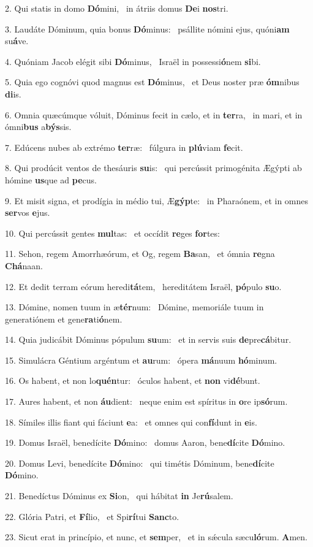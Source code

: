 2. Qui statis in domo \textbf{Dó}mini, \ast\  in átriis domus \textbf{De}i \textbf{nos}tri.\

3. Laudáte Dóminum, quia bonus \textbf{Dó}minus: \ast\  psállite nómini ejus, quóni\textbf{am} su\textbf{á}ve.\

4. Quóniam Jacob elégit sibi \textbf{Dó}minus, \ast\  Israël in possessi\textbf{ó}nem \textbf{si}bi.\

5. Quia ego cognóvi quod magnus est \textbf{Dó}minus, \ast\  et Deus noster præ \textbf{óm}nibus \textbf{di}is.\

6. Omnia quæcúmque vóluit, Dóminus fecit in cælo, et in \textbf{ter}ra, \ast\  in mari, et in ómni\textbf{bus} a\textbf{býs}sis.\

7. Edúcens nubes ab extrémo \textbf{ter}ræ: \ast\  fúlgura in \textbf{plú}viam \textbf{fe}cit.\

8. Qui prodúcit ventos de thesáuris \textbf{su}is: \ast\  qui percússit primogénita Ægýpti ab hómine \textbf{us}que ad \textbf{pe}cus.\

9. Et misit signa, et prodígia in médio tui, Æ\textbf{gýp}te: \ast\  in Pharaónem, et in omnes \textbf{ser}vos \textbf{e}jus.\

10. Qui percússit gentes \textbf{mul}tas: \ast\  et occídit \textbf{re}ges \textbf{for}tes:\

11. Sehon, regem Amorrhæórum, et Og, regem \textbf{Ba}san, \ast\  et ómnia \textbf{re}gna \textbf{Chá}naan.\

12. Et dedit terram eórum heredi\textbf{tá}tem, \ast\  hereditátem Israël, \textbf{pó}pulo \textbf{su}o.\

13. Dómine, nomen tuum in æ\textbf{tér}num: \ast\  Dómine, memoriále tuum in generatiónem et gene\textbf{ra}ti\textbf{ó}nem.\

14. Quia judicábit Dóminus pópulum \textbf{su}um: \ast\  et in servis suis \textbf{de}pre\textbf{cá}bitur.\

15. Simulácra Géntium argéntum et \textbf{au}rum: \ast\  ópera \textbf{má}nuum \textbf{hó}minum.\

16. Os habent, et non lo\textbf{quén}tur: \ast\  óculos habent, et \textbf{non} vi\textbf{dé}bunt.\

17. Aures habent, et non \textbf{áu}dient: \ast\  neque enim est spíritus in \textbf{o}re ip\textbf{só}rum.\

18. Símiles illis fiant qui fáciunt \textbf{e}a: \ast\  et omnes qui con\textbf{fí}dunt in \textbf{e}is.\

19. Domus Israël, benedícite \textbf{Dó}mino: \ast\  domus Aaron, bene\textbf{dí}cite \textbf{Dó}mino.\

20. Domus Levi, benedícite \textbf{Dó}mino: \ast\  qui timétis Dóminum, bene\textbf{dí}cite \textbf{Dó}mino.\

21. Benedíctus Dóminus ex \textbf{Si}on, \ast\  qui hábitat \textbf{in} Je\textbf{rú}salem.\

22. Glória Patri, et \textbf{Fí}lio, \ast\  et Spi\textbf{rí}tui \textbf{Sanc}to.\

23. Sicut erat in princípio, et nunc, et \textbf{sem}per, \ast\  et in sǽcula sæcu\textbf{ló}rum. \textbf{A}men.\

